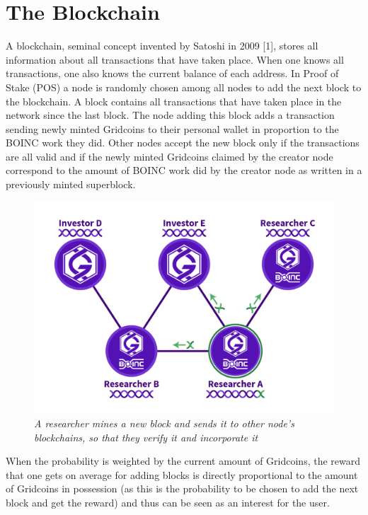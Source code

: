 \section{The Blockchain}

A blockchain, seminal concept invented by Satoshi in 2009 [1], stores all information about all transactions that have taken place. When one knows all transactions, one also knows the current balance of each address. In Proof of Stake (POS) a node is randomly chosen among all nodes to add the next block to the blockchain. A block contains all transactions that have taken place in the network since the last block. The node adding this block adds a transaction sending newly minted Gridcoins to their personal wallet in proportion to the BOINC work they did. Other nodes accept the new block only if the transactions are all valid and if the newly minted Gridcoins claimed by the creator node correspond to the amount of BOINC work did by the creator node as written in a previously minted superblock. 

\begin{figure}
\centering
\includegraphics[scale=0.5]{figures/NetworkAndNodes_joshoeah}
\medskip
\caption{\textit{A researcher mines a new block and sends it to other node's blockchains, so that they verify it and incorporate it}}
\small
\end{figure}
 
When the probability is weighted by the current amount of Gridcoins, the reward that one gets on average for adding blocks is directly proportional to the amount of Gridcoins in possession (as this is the probability to be chosen to add the next block and get the reward) and thus can be seen as an interest for the user.
